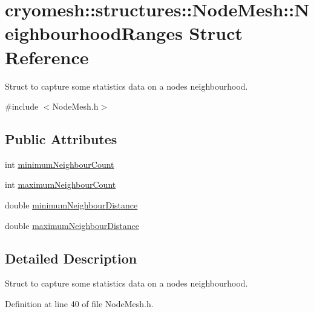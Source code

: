 \hypertarget{structcryomesh_1_1structures_1_1NodeMesh_1_1NeighbourhoodRanges}{\section{cryomesh\-:\-:structures\-:\-:\-Node\-Mesh\-:\-:\-Neighbourhood\-Ranges \-Struct \-Reference}
\label{structcryomesh_1_1structures_1_1NodeMesh_1_1NeighbourhoodRanges}
}


\-Struct to capture some statistics data on a nodes neighbourhood.  




{\ttfamily \#include $<$\-Node\-Mesh.\-h$>$}

\subsection*{\-Public \-Attributes}
\begin{DoxyCompactItemize}
\item 
int \hyperlink{structcryomesh_1_1structures_1_1NodeMesh_1_1NeighbourhoodRanges_a4b876991aee7092aef9aa67806aaa1ce}{minimum\-Neighbour\-Count}
\item 
int \hyperlink{structcryomesh_1_1structures_1_1NodeMesh_1_1NeighbourhoodRanges_a69233448f52c9718f855703f61509180}{maximum\-Neighbour\-Count}
\item 
double \hyperlink{structcryomesh_1_1structures_1_1NodeMesh_1_1NeighbourhoodRanges_a7d36869bd701062cb4305cb5d55a4741}{minimum\-Neighbour\-Distance}
\item 
double \hyperlink{structcryomesh_1_1structures_1_1NodeMesh_1_1NeighbourhoodRanges_af4f46742b43f5284a702150f69853c0d}{maximum\-Neighbour\-Distance}
\end{DoxyCompactItemize}


\subsection{\-Detailed \-Description}
\-Struct to capture some statistics data on a nodes neighbourhood. 

\-Definition at line 40 of file \-Node\-Mesh.\-h.



